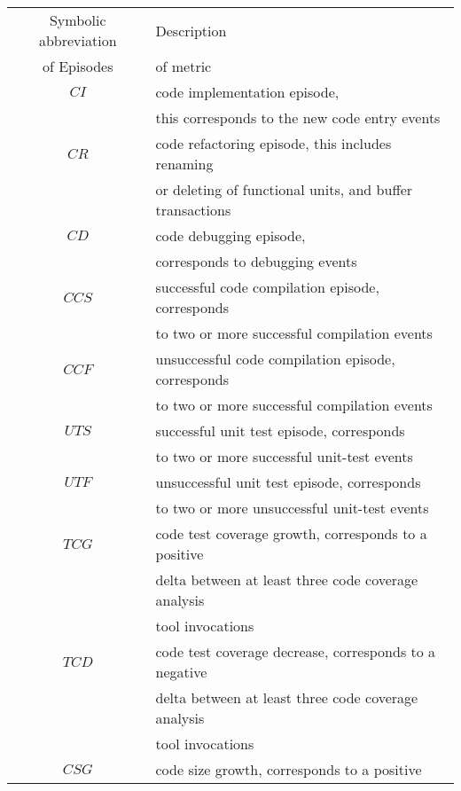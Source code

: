 \begin{table}
\begin{center}
    \begin{tabular}{ | c | l | }
    \hline
    Symbolic abbreviation 	& Description \\ 
    of Episodes 						& of metric	  \\ 
    \hline
    $CI$ 									& code implementation episode, \\ 
    											& this corresponds to the new code entry events \\
	  \hline
    $CR$ 									& code refactoring episode, this includes renaming \\
    											& or deleting of functional units, and buffer transactions \\
    \hline
    $CD$ 									& code debugging episode, \\
    											& corresponds to debugging events \\
		\hline
		$CCS$ 								& successful code compilation episode, corresponds \\
													& to two or more successful compilation events \\
		\hline
		$CCF$ 								& unsuccessful code compilation episode, corresponds \\
													& to two or more successful compilation events \\
    \hline
		$UTS$ 								& successful unit test episode, corresponds \\
													& to two or more successful unit-test events \\
		\hline
		$UTF$ 							  & unsuccessful unit test episode, corresponds \\
													& to two or more unsuccessful unit-test events \\
		\hline
		$TCG$ 								& code test coverage growth, corresponds to a positive \\
													& delta between at least three code coverage analysis \\
													& tool invocations \\
		\hline
		$TCD$ 								& code test coverage decrease, corresponds to a negative \\
													& delta between at least three code coverage analysis \\
													& tool invocations \\
		\hline
		$CSG$ 								& code size growth, corresponds to a positive \\

\end{tabular}
\end{center}
\end{table}
